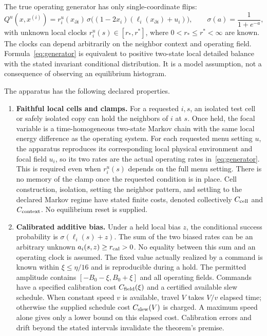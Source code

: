 \documentclass[11pt]{article}
\newcommand{\sig}{\sigma}
\begin{document}
The true operating generator has only single-coordinate flips:
\begin{equation}
 Q^u(x,x^{(i)})=r_i^u(x_{\partial i})\,
 \sig\bigl((1-2x_i)(\ell_i(x_{\partial i})+u_i)\bigr),\qquad
 \sig(a)=\frac1{1+e^{-a}},
 \label{eq:generator}
\end{equation}
with unknown local clocks $r_i^u(s)\in[r_*,r^*]$, where $0<r_*\le r^*<\infty$ are known. The clocks can depend arbitrarily on the neighbor context and operating field. Formula~\eqref{eq:generator} is equivalent to positive two-state local detailed balance with the stated invariant conditional distribution. It is a model assumption, not a consequence of observing an equilibrium histogram.

The apparatus has the following declared properties.
\begin{enumerate}
\item \textbf{Faithful local cells and clamps.} For a requested $i,s$, an isolated test cell or safely isolated copy can hold the neighbors of $i$ at $s$. Once held, the focal variable is a time-homogeneous two-state Markov chain with the same local energy difference as the operating system. For each requested menu setting $u$, the apparatus reproduces its corresponding local physical environment and focal field $u_i$, so its two rates are the actual operating rates in~\eqref{eq:generator}. This is required even when $r_i^u(s)$ depends on the full menu setting. There is no memory of the clamp once the requested condition is in place. Cell construction, isolation, setting the neighbor pattern, and settling to the declared Markov regime have stated finite costs, denoted collectively $C_{\rm cell}$ and $C_{\rm context}$. No equilibrium reset is supplied.
\item \textbf{Calibrated additive bias.} Under a held local bias $z$, the conditional success probability is $\sig(\ell_i(s)+z)$. The sum of the two biased rates can be an arbitrary unknown $a_i(s,z)\ge r_{\rm cal}>0$. No equality between this sum and an operating clock is assumed. The fixed value actually realized by a command is known within $\xi\le\eta/16$ and is reproducible during a hold. The permitted amplitude contains $[-B_0-\xi,B_0+\xi]$ and all operating fields. Commands have a specified calibration cost $C_{\rm field}(\xi)$ and a certified available slew schedule. When constant speed $v$ is available, travel $V$ takes $V/v$ elapsed time; otherwise the supplied schedule cost $C_{\rm slew}(V)$ is charged. A maximum speed alone gives only a lower bound on this elapsed cost. Calibration errors and drift beyond the stated intervals invalidate the theorem's premise.

\end{enumerate}
\end{document}
